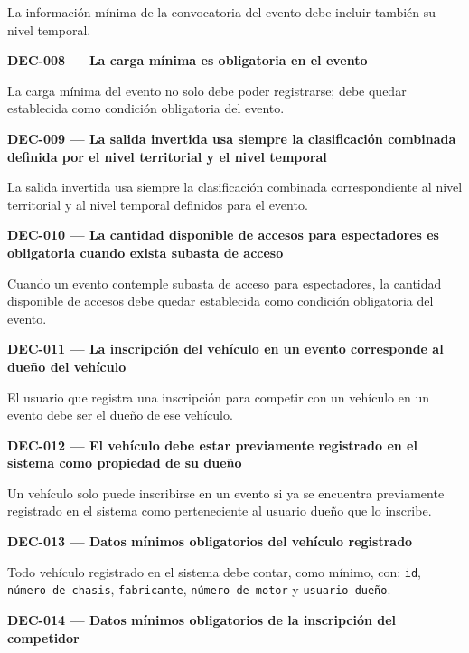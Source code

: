 \documentclass[10pt,letterpaper]{article}
\begin{document}
La información mínima de la convocatoria del evento debe incluir también su nivel temporal.\par\vspace{0.45em}
\noindent\textbf{DEC-008 --- La carga mínima es obligatoria en el evento}\par
La carga mínima del evento no solo debe poder registrarse; debe quedar establecida como condición obligatoria del evento.\par\vspace{0.45em}
\noindent\textbf{DEC-009 --- La salida invertida usa siempre la clasificación combinada definida por el nivel territorial y el nivel temporal}\par
La salida invertida usa siempre la clasificación combinada correspondiente al nivel territorial y al nivel temporal definidos para el evento.\par\vspace{0.45em}
\noindent\textbf{DEC-010 --- La cantidad disponible de accesos para espectadores es obligatoria cuando exista subasta de acceso}\par
Cuando un evento contemple subasta de acceso para espectadores, la cantidad disponible de accesos debe quedar establecida como condición obligatoria del evento.\par\vspace{0.45em}
\noindent\textbf{DEC-011 --- La inscripción del vehículo en un evento corresponde al dueño del vehículo}\par
El usuario que registra una inscripción para competir con un vehículo en un evento debe ser el dueño de ese vehículo.\par\vspace{0.45em}
\noindent\textbf{DEC-012 --- El vehículo debe estar previamente registrado en el sistema como propiedad de su dueño}\par
Un vehículo solo puede inscribirse en un evento si ya se encuentra previamente registrado en el sistema como perteneciente al usuario dueño que lo inscribe.\par\vspace{0.45em}
\noindent\textbf{DEC-013 --- Datos mínimos obligatorios del vehículo registrado}\par
Todo vehículo registrado en el sistema debe contar, como mínimo, con: \texttt{id}, \texttt{número de chasis}, \texttt{fabricante}, \texttt{número de motor} y \texttt{usuario dueño}.\par\vspace{0.45em}
\noindent\textbf{DEC-014 --- Datos mínimos obligatorios de la inscripción del competidor}\par
\end{document}
